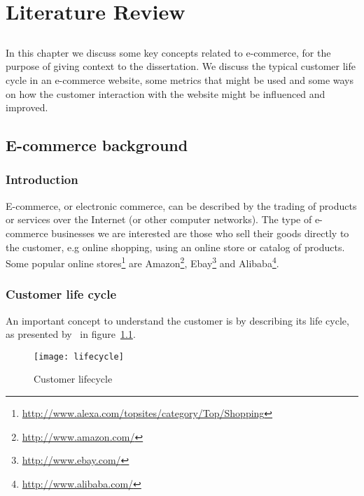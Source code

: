 \chapter{Literature Review} \label{chap:state_art}

\section*{}

In this chapter we discuss some key concepts related to e-commerce, for the 
purpose of giving context to the dissertation. We discuss the typical customer 
life cycle in an e-commerce website, some metrics that might be used and some 
ways on how the customer interaction with the website might be influenced and 
improved.

\section{E-commerce background} \label{chap:ecommerce}

\subsection{Introduction}

E-commerce, or electronic commerce, can be described by the trading of products 
or services over the Internet (or other computer networks). The type of 
e-commerce businesses we are interested are those who sell their goods directly 
to the customer, e.g online shopping, using an online store or catalog of 
products. Some popular online 
stores\footnote{\url{http://www.alexa.com/topsites/category/Top/Shopping}} are 
Amazon\footnote{\url{http://www.amazon.com/}}, 
Ebay\footnote{\url{http://www.ebay.com/}} and 
Alibaba\footnote{\url{http://www.alibaba.com/}}.

\subsection{Customer life cycle}

An important concept to understand the customer is by describing its life 
cycle, as presented by~\cite[Section 6]{Sterne2000} in 
figure~\ref{fig:lifecycle}.

\begin{figure}[h]
  \begin{center}
    \leavevmode
    \texttt{[image: lifecycle]}
    \caption{Customer lifecycle \cite{Sterne2000}}
    \label{fig:lifecycle}
  \end{center}
\end{figure}

